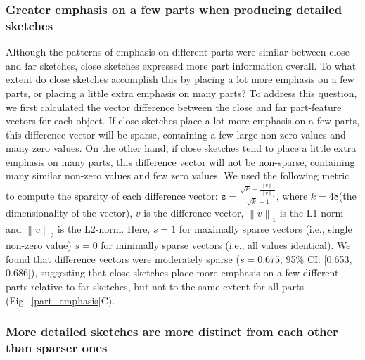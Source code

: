 \documentclass[10pt,letterpaper]{article}
\newcommand\norm[1]{\left\lVert#1\right\rVert}
\begin{document}
\subsubsection{Greater emphasis on a few parts when producing detailed sketches}

Although the patterns of emphasis on different parts were similar between close and far sketches, close sketches expressed more part information overall.
To what extent do close sketches accomplish this by placing a lot more emphasis on a few parts, or placing a little extra emphasis on many parts?
To address this question, we first calculated the vector difference between the close and far part-feature vectors for each object.
If close sketches place a lot more emphasis on a few parts, this difference vector will be sparse, containing a few large non-zero values and many zero values. 
On the other hand, if close sketches tend to place a little extra emphasis on many parts, this difference vector will not be non-sparse, containing many similar non-zero values and few zero values. 
We used the following metric to compute the sparsity of each difference vector:
$\texttt{s}= \frac{\sqrt{k} - \frac{\norm{v}_1}{\norm{v}_2}}{\sqrt{k}-1}$, where $k=48$(the dimensionality of the vector), $v$ is the difference vector, $\norm{v}_1$ is the L1-norm and $\norm{v}_2$ is the L2-norm. 
Here, $s=1$ for maximally sparse vectors (i.e., single non-zero value) $s=0$ for minimally sparse vectors (i.e., all values identical).
We found that difference vectors were moderately sparse ($s=0.675$, 95\% CI: [0.653, 0.686]), suggesting that close sketches place more emphasis on a few different parts relative to far sketches, but not to the same extent for all parts (Fig.~\ref{part_emphasis}C).

\subsubsection{More detailed sketches are more distinct from each other than sparser ones}
\end{document}
